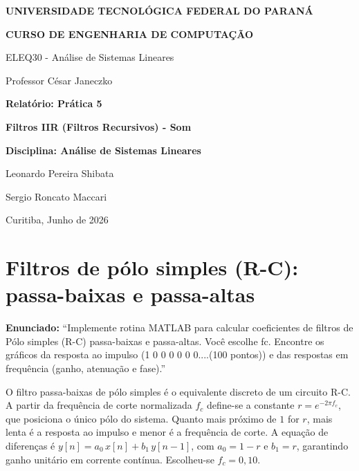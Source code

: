 \documentclass[12pt,a4paper]{article}
\begin{document}
\begin{titlepage}
\centering
{\Large\bfseries UNIVERSIDADE TECNOL\'OGICA FEDERAL DO PARAN\'A\par}
{\Large\bfseries CURSO DE ENGENHARIA DE COMPUTA\c{C}\~AO\par}
\vspace{0.4cm}
{ELEQ30 - An\'alise de Sistemas Lineares\par}
{Professor C\'esar Janeczko\par}

\vspace{4.5cm}
{\Huge\bfseries Relat\'orio: Pr\'atica 5\par}
\vspace{0.4cm}
{\large\bfseries Filtros IIR (Filtros Recursivos) - Som\par}

\vspace{2.5cm}
{\large\bfseries Disciplina: An\'alise de Sistemas Lineares\par}

\vspace{3.5cm}
{Leonardo Pereira Shibata\par}
\vspace{0.2cm}
{Sergio Roncato Maccari\par}

\vfill
{Curitiba, Junho de 2026\par}
\end{titlepage}

\section{Filtros de p\'olo simples (R-C): passa-baixas e passa-altas}
\textbf{Enunciado:} ``Implemente rotina MATLAB para calcular coeficientes de
filtros de P\'olo simples (R-C) passa-baixas e passa-altas. Voc\^e escolhe fc.
Encontre os gr\'aficos da resposta ao impulso (1 0 0 0 0 0  0....(100 pontos)) e
das respostas em frequ\^encia (ganho, atenua\c{c}\~ao e fase).''

\vspace{0.3cm}
O filtro passa-baixas de p\'olo simples \'e o equivalente discreto de um circuito
R-C. A partir da frequ\^encia de corte normalizada $f_c$ define-se a constante
$r = e^{-2\pi f_c}$, que posiciona o \'unico p\'olo do sistema. Quanto mais
pr\'oximo de $1$ for $r$, mais lenta \'e a resposta ao impulso e menor \'e a
frequ\^encia de corte. A equa\c{c}\~ao de diferen\c{c}as \'e
$y[n] = a_0\,x[n] + b_1\,y[n-1]$, com $a_0 = 1-r$ e $b_1 = r$, garantindo ganho
unit\'ario em corrente cont\'inua. Escolheu-se $f_c = 0{,}10$.
\end{document}
